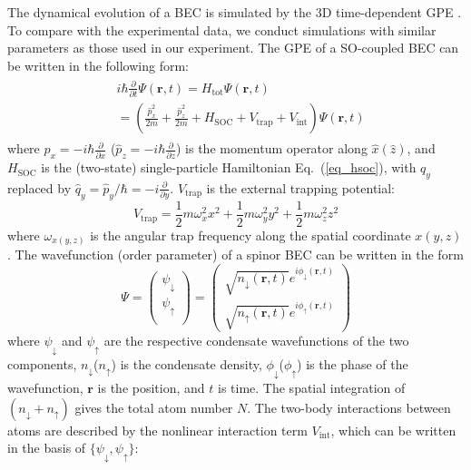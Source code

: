 \documentclass[showpacs,preprintnumbers,amsmath,amssymb, superscriptaddress, aps, reprint]{revtex4-1}
\begin{document}
{{{The dynamical evolution of a BEC is simulated by the 3D time-dependent GPE \cite{Bao2003}. To compare with the experimental data, we conduct simulations with similar parameters as those used in our experiment. The GPE of a SO-coupled BEC can be written in the following form:
\begin{align}
\begin{split}
\label{GPE_Eq}
&i\hbar {\frac{\partial}{\partial t}}\Psi \left( {\textbf{r},t} \right) = H_{\text{tot}}\Psi\left( {\textbf{r},t} \right) \\
&= \left( \frac{\hat{p}_x^2}{2m}+\frac{\hat{p}_z^2}{2m} + {{H_{\text{SOC}}} + {V_{\text{trap}}} + {V_{\text{int} }}} \right)\Psi \left( {\textbf{r},t} \right)
\end{split}
\end{align}
where $\hat{p}_{x}=-i\hbar\frac{\partial}{\partial x}$ ($\hat{p}_{z}=-i\hbar\frac{\partial}{\partial z}$) is the momentum operator along $\hat{x}(\hat{z})$, and $H_{\text{SOC}}$ is the (two-state) single-particle Hamiltonian Eq.~(\ref{eq_hsoc}), {with $q_y$ replaced by $\hat{q}_y=\hat{p}_y/\hbar=-i\frac{\partial}{\partial y}$}. $V_{\text{trap}}$ is the external trapping potential:
\begin{equation}
{V_{\text{trap}}} = \frac{1}{2}m\omega _x^2{x^2} + \frac{1}{2}m\omega _y^2{y^2} + \frac{1}{2}m\omega _z^2{z^2}
\end{equation}
where $\omega_{x(y,z)}$ is the angular trap frequency along the spatial coordinate $x(y,z)$. The wavefunction (order parameter) of a spinor BEC can be written in the form 
\begin{equation}
\label{eq_orderpara}
\Psi=
\begin{pmatrix}
\psi_{\downarrow}\\
\psi_{\uparrow}\\
\end{pmatrix}=
\begin{pmatrix}
\sqrt{n_{\downarrow}(\textbf{r},t)}e^{i\phi_{\downarrow}(\textbf{r},t) } \\ \sqrt{n_{\uparrow}(\textbf{r},t)}e^{i\phi_{\uparrow}(\textbf{r},t) }
\end{pmatrix}
\end{equation}
where $\psi_{\downarrow}$ and $\psi_{\uparrow}$ are the respective condensate wavefunctions of the two components, $n_{\downarrow}$($n_{\uparrow}$) is the condensate density, $\phi_{\downarrow}$($\phi_{\uparrow}$) is the phase of the wavefunction, $\textbf{r}$ is the position, and $t$ is time. The spatial integration of $(n_{\downarrow}+n_{\uparrow})$ gives the total atom number $N$. The two-body interactions between atoms are described by the nonlinear interaction term $V_{\text{int} }$, which can be written in the basis of $\{\psi_{\downarrow}, \psi_{\uparrow}\}$:
}}}
\end{document}
